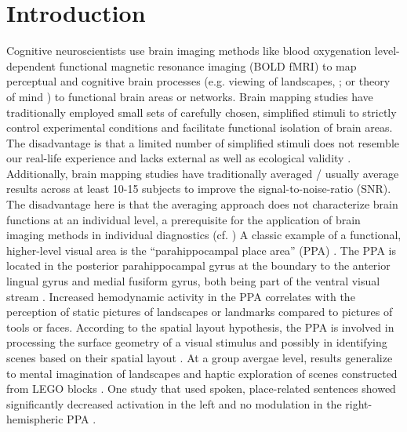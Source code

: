 \documentclass[english]{article}
\begin{document}
\section{Introduction}
Cognitive neuroscientists use brain imaging methods like blood oxygenation level-dependent functional magnetic resonance imaging (BOLD fMRI) to map perceptual and cognitive brain processes (e.g. viewing of landscapes, \citep{epstein1998ppa}; or theory of mind \citep{spunt2014validating}) to functional brain areas or networks.
Brain mapping studies have traditionally employed small sets of carefully chosen, simplified stimuli to strictly control experimental conditions and facilitate functional isolation of brain areas.
The disadvantage is that a limited number of simplified stimuli does not resemble our real-life experience and lacks external \citep{westfall2016fixing} as well as ecological validity \citep{hasson2004intersubject}.
Additionally, brain mapping studies have traditionally averaged / usually average results across at least 10-15 subjects to improve the signal-to-noise-ratio (SNR).
The disadvantage here is that the averaging approach does not characterize brain functions at an individual level, a prerequisite for the application of brain imaging methods in individual diagnostics (cf. \citep{dubois2016building})
A classic example of a functional, higher-level visual area is the ``parahippocampal place area'' (PPA) \citep{epstein1998ppa, epstein1999parahippocampal}.
The PPA is located in the posterior parahippocampal gyrus at the boundary to the anterior lingual gyrus and medial fusiform gyrus, both being part of the ventral visual stream \citep{mishkin1982contribution, goodale1992separate}.
Increased hemodynamic activity in the PPA correlates with the perception of static pictures of landscapes or landmarks compared to pictures of tools or faces.
According to the spatial layout hypothesis, the PPA is involved in processing the surface geometry of a visual stimulus and possibly in identifying scenes based on their spatial layout \citep{epstein2010reliable}.
At a group avergae level, results generalize to mental imagination of landscapes \citep{ocraven2000mental} and haptic exploration of scenes constructed from LEGO blocks \citep{wolbers2011modality}.
One study that used spoken, place-related sentences showed significantly decreased activation in the left and no modulation in the right-hemispheric PPA \citep{aziz2008modulation}.
\end{document}
